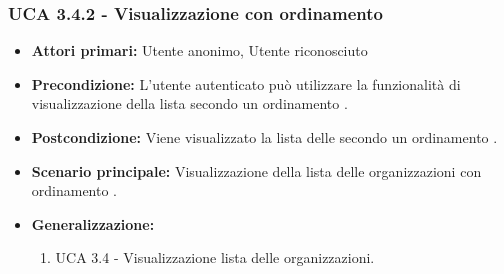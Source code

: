 \subsubsection{UCA 3.4.2 - Visualizzazione con ordinamento }%
\begin{itemize}	
	\item \textbf{Attori primari:} Utente anonimo, Utente riconosciuto
	\item \textbf{Precondizione:} L'utente autenticato può utilizzare la funzionalità di visualizzazione della lista secondo un ordinamento .
	\item \textbf{Postcondizione:} Viene visualizzato la lista delle  secondo un ordinamento .
	\item \textbf{Scenario principale:} Visualizzazione della lista delle organizzazioni con ordinamento .
	\item \textbf{Generalizzazione:}
	\begin{enumerate}
	\item UCA 3.4 - Visualizzazione lista delle organizzazioni.
	\end{enumerate}	
\end{itemize}


